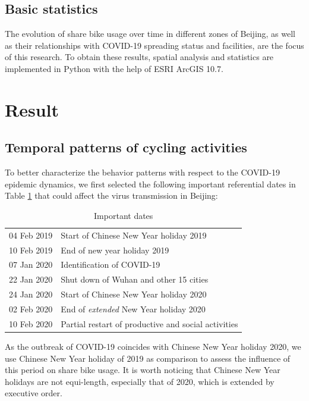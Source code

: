 \documentclass[preprints,ijgi,submit,moreauthors]{Definitions/mdpi}
\begin{document}
\subsection{Basic statistics}
The evolution of share bike usage over time in different zones of Beijing, as well as their relationships with COVID-19 spreading status and facilities, are the focus of this research.
To obtain these results, spatial analysis and statistics are implemented in Python with the help of ESRI ArcGIS 10.7. 

\section{Result}

\subsection{Temporal patterns of cycling activities}
To better characterize the behavior patterns with respect to the COVID-19 epidemic dynamics, we first selected the following important referential dates in Table \ref{tab:important_dates} that could affect the virus transmission in Beijing: 

\begin{table}[ht]
    \centering
    \begin{tabular}{ll}
    04 Feb 2019 & Start of Chinese New Year holiday 2019\\
    10 Feb 2019 & End of new year holiday 2019\\
    07 Jan 2020 & Identification of COVID-19\\
    22 Jan 2020 & Shut down of Wuhan and other 15 cities\\
    24 Jan 2020 & Start of Chinese New Year holiday 2020\\
    02 Feb 2020 & End of \textit{extended} New Year holiday 2020\\
    10 Feb 2020 & Partial restart of productive and social activities
    \end{tabular}
    \caption{Important dates}
    \label{tab:important_dates}
\end{table}

As the outbreak of COVID-19 coincides with Chinese New Year holiday 2020, we use Chinese New Year holiday of 2019 as comparison to assess the influence of this period on share bike usage.
It is worth noticing that Chinese New Year holidays are not equi-length, especially that of 2020, which is extended by executive order.
\end{document}
